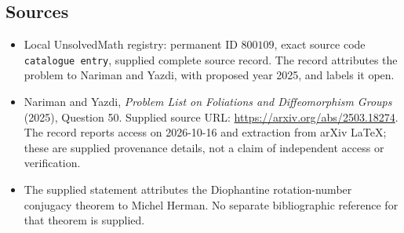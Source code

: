 \documentclass[11pt]{article}
\begin{document}
\subsection{Sources}
\begin{itemize}
\item Local UnsolvedMath registry: permanent ID \(800109\), exact source code \texttt{catalogue entry}, supplied complete source record. The record attributes the problem to Nariman and Yazdi, with proposed year 2025, and labels it open.
\item Nariman and Yazdi, \emph{Problem List on Foliations and Diffeomorphism Groups} (2025), Question 50. Supplied source URL: \url{https://arxiv.org/abs/2503.18274}. The record reports access on 2026-10-16 and extraction from arXiv LaTeX; these are supplied provenance details, not a claim of independent access or verification.
\item The supplied statement attributes the Diophantine rotation-number conjugacy theorem to Michel Herman. No separate bibliographic reference for that theorem is supplied.
\end{itemize}
\end{document}
